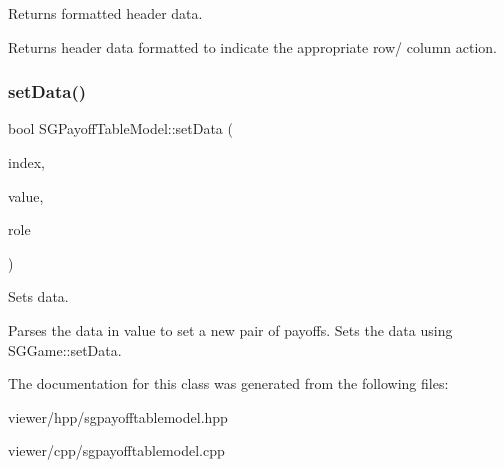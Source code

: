 Returns formatted header data. 

Returns header data formatted to indicate the appropriate row/ column action. \mbox{\label{classSGPayoffTableModel_a9be799422c8a564a00911e959c795b5d}} 
\subsubsection{\texorpdfstring{set\+Data()}{setData()}}
{\footnotesize\ttfamily bool S\+G\+Payoff\+Table\+Model\+::set\+Data (\begin{DoxyParamCaption}\item[{const Q\+Model\+Index \&}]{index,  }\item[{const Q\+Variant \&}]{value,  }\item[{int}]{role }\end{DoxyParamCaption})}



Sets data. 

Parses the data in value to set a new pair of payoffs. Sets the data using S\+G\+Game\+::set\+Data. 

The documentation for this class was generated from the following files\+:\begin{DoxyCompactItemize}
\item 
viewer/hpp/sgpayofftablemodel.\+hpp\item 
viewer/cpp/sgpayofftablemodel.\+cpp\end{DoxyCompactItemize}
